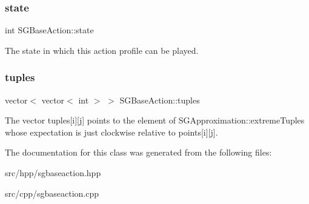 \subsubsection{\texorpdfstring{state}{state}}
{\footnotesize\ttfamily int S\+G\+Base\+Action\+::state\hspace{0.3cm}{\ttfamily [protected]}}

The state in which this action profile can be played. \mbox{\label{classSGBaseAction_a0cc43472c6c4cf598209d1e36eb28545}} 
\subsubsection{\texorpdfstring{tuples}{tuples}}
{\footnotesize\ttfamily vector$<$ vector$<$ int $>$ $>$ S\+G\+Base\+Action\+::tuples\hspace{0.3cm}{\ttfamily [protected]}}

The vector tuples\mbox{[}i\mbox{]}\mbox{[}j\mbox{]} points to the element of S\+G\+Approximation\+::extreme\+Tuples whose expectation is just clockwise relative to points\mbox{[}i\mbox{]}\mbox{[}j\mbox{]}. 

The documentation for this class was generated from the following files\+:\begin{DoxyCompactItemize}
\item 
src/hpp/sgbaseaction.\+hpp\item 
src/cpp/sgbaseaction.\+cpp\end{DoxyCompactItemize}
